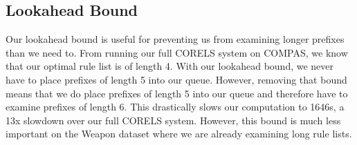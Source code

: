 \subsection{Lookahead Bound}
Our lookahead bound is useful for preventing us from examining longer prefixes than we need to.
From running our full CORELS system on COMPAS, we know that our optimal rule list is of length 4.
With our lookahead bound, we never have to place prefixes of length 5 into our queue.
However, removing that bound means that we do place prefixes of length 5 into our queue and therefore have to examine prefixes of length 6.
This drastically slows our computation to 1646s, a 13x slowdown over our full CORELS system.
However, this bound is much less important on the Weapon dataset where we are already examining long rule lists.


